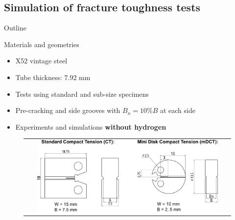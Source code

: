 \documentclass[9pt]{beamer}
\begin{document}

\subsection{Simulation of fracture toughness tests}

\begin{frame}{Outline}
	\tableofcontents[ 
    currentsubsection, 
    hideothersubsections, 
    sectionstyle=show/shaded, 
    subsectionstyle=show/shaded, 
    ] 
\end{frame}


\begin{frame}{Materials and geometries}

    \begin{itemize}
        \item X52 vintage steel
        \vspace{0.15cm}
        \item Tube thickness: 7.92 mm
        \vspace{0.15cm}
        \item Tests using standard and sub-size specimens
        \vspace{0.15cm}
        \item Pre-cracking and side grooves with $B_n = 10\%B$ at each side
        \vspace{0.15cm}
        \item Experiments and simulations \textbf{without hydrogen}
    \end{itemize}
    
    \vspace{0.25cm}

    \begin{figure}
        \begin{tabular}{c}
            \includegraphics[width=0.9\textwidth]{Images/CT_mDCT_specimens_X52.pdf} \\
        \end{tabular}
    \end{figure}

\end{frame}
\end{document}
